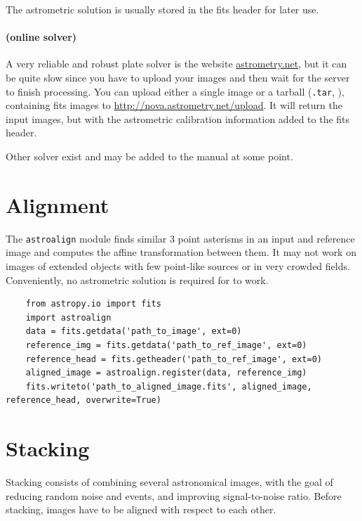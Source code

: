 \documentclass[a4paper, 11pt, fleqn]{memoir}
\begin{document}
The astrometric solution is usually stored in the fits header for later use.

\paragraph{ (online solver)}
A very reliable and robust plate solver is the website \url{astrometry.net}, but it can be quite slow since you have to upload your images and then wait for the server to finish processing.
You can upload either a single image or a tarball (\texttt{.tar}, ), containing fits images to \url{http://nova.astrometry.net/upload}.
It will return the input images, but with the astrometric calibration information added to the fits header.

Other solver exist and may be added to the manual at some point.

\section{Alignment}
\label{ssec:alignment}

The \texttt{astroalign} module finds similar 3 point asterisms in an input and reference image and computes the affine transformation between them.
It may not work on images of extended objects with few point-like sources or in very crowded fields.
Conveniently, no astrometric solution is required for  to work.
\begin{verbatim}
    from astropy.io import fits
    import astroalign
    data = fits.getdata('path_to_image', ext=0)
    reference_img = fits.getdata('path_to_ref_image', ext=0)
    reference_head = fits.getheader('path_to_ref_image', ext=0)
    aligned_image = astroalign.register(data, reference_img)
    fits.writeto('path_to_aligned_image.fits', aligned_image, reference_head, overwrite=True)
\end{verbatim}



\section{Stacking}
\label{ssec:stacking}

Stacking consists of combining several astronomical images, with the goal of reducing random noise and events, and improving signal-to-noise ratio.
Before stacking, images have to be aligned with respect to each other.
\end{document}
